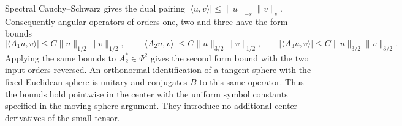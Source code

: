 Spectral Cauchy--Schwarz gives the dual pairing
$|\langle u,v\rangle|\le\|u\|_{-s}\|v\|_s$.
Consequently angular operators of orders one, two and three have the
form bounds
\[
 |\langle A_1u,v\rangle|\le C\|u\|_{1/2}\|v\|_{1/2},\qquad
 |\langle A_2u,v\rangle|\le C\|u\|_{3/2}\|v\|_{1/2},\qquad
 |\langle A_3u,v\rangle|\le C\|u\|_{3/2}\|v\|_{3/2}.
\]
Applying the same bounds to $A_2^*\in\Psi^2$ gives the second form
bound with the two input orders reversed. An orthonormal identification
of a tangent sphere with the fixed
Euclidean sphere is unitary and conjugates $B$ to this same operator.
Thus the bounds hold pointwise in the center with the uniform symbol
constants specified in the moving-sphere argument. They introduce no
additional center derivatives of the small tensor.
